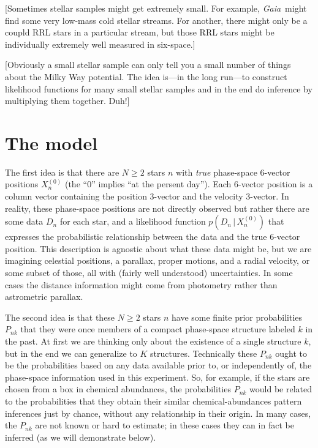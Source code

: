 \documentclass[letterpaper,12pt,preprint]{aastex}
\newcommand{\project}[1]{\textsl{#1}}
\newcommand{\gaia}{\project{Gaia}}
\newcommand{\given}{\,|\,}
\begin{document}
[Sometimes stellar samples might get extremely small.  For example,
  \gaia\ might find some very low-mass cold stellar streams.  For
  another, there might only be a coupld RRL stars in a particular
  stream, but those RRL stars might be individually extremely well
  measured in six-space.]

[Obviously a small stellar sample can only tell you a small number of
  things about the Milky Way potential.  The idea is---in the long
  run---to construct likelihood functions for many small stellar
  samples and in the end do inference by multiplying them together.
  Duh!]

\section{The model}

The first idea is that there are $N\geq 2$ stars $n$ with \emph{true}
phase-space 6-vector positions $X_n^{(0)}$ (the ``$0$'' implies ``at the
persent day'').  Each 6-vector position is a column vector containing
the position 3-vector and the velocity 3-vector.  In reality, these
phase-space positions are not directly observed but rather there are
some data $D_n$ for each star, and a likelihood function $p(D_n\given
X_n^{(0)})$ that expresses the probabilistic relationship between the data
and the true 6-vector position.  This description is agnostic about
what these data might be, but we are imagining celestial positions, a
parallax, proper motions, and a radial velocity, or some subset of
those, all with (fairly well understood) uncertainties.  In some cases
the distance information might come from photometry rather than
astrometric parallax.

The second idea is that these $N\geq 2$ stars $n$ have some finite
prior probabilities $P_{nk}$ that they were once members of a compact
phase-space structure labeled $k$ in the past.  At first we are
thinking only about the existence of a single structure $k$, but in
the end we can generalize to $K$ structures.  Technically these
$P_{nk}$ ought to be the probabilities based on any data available
prior to, or independently of, the phase-space information used in
this experiment.  So, for example, if the stars are chosen from a box
in chemical abundances, the probabilities $P_{nk}$ would be related to
the probabilities that they obtain their similar chemical-abundances
pattern inferences just by chance, without any relationship in their
origin.  In many cases, the $P_{nk}$ are not known or hard to
estimate; in these cases they can in fact be inferred (as we will
demonstrate below).
\end{document}
